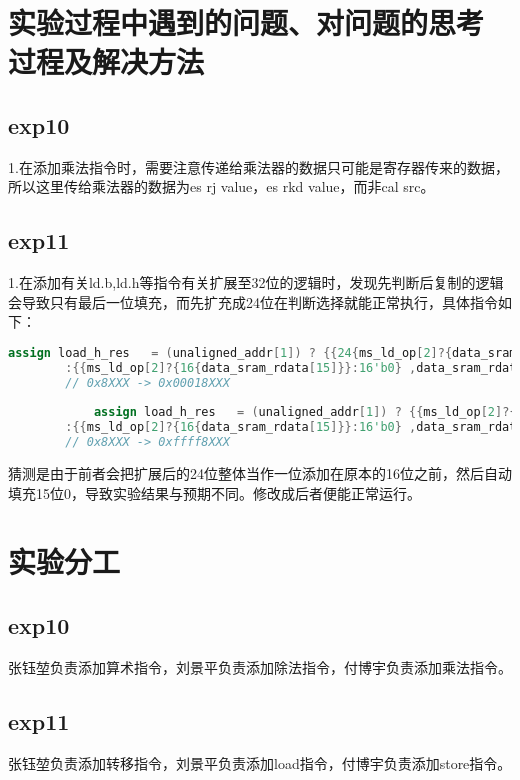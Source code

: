 \documentclass[12pt,a4paper]{article}
\newcommand*{\song}{\CJKfamily{zhsong}}
\newcommand{\sectionfont}{\song\textbf}
\begin{document}
\section{\sectionfont 实验过程中遇到的问题、对问题的思考过程及解决方法}
    \subsection{exp10}
        1.在添加乘法指令时，需要注意传递给乘法器的数据只可能是寄存器传来的数据，所以这里传给乘法器的数据为es rj value，es rkd value，而非cal src。
    \subsection{exp11}
        1.在添加有关ld.b,ld.h等指令有关扩展至32位的逻辑时，发现先判断后复制的逻辑会导致只有最后一位填充，而先扩充成24位在判断选择就能正常执行，具体指令如下：
        \begin{lstlisting}[language=Verilog]
            assign load_h_res   = (unaligned_addr[1]) ? {{24{ms_ld_op[2]?{data_sram_rdata[31]}:0}} ,data_sram_rdata[31:16]}
        :{{ms_ld_op[2]?{16{data_sram_rdata[15]}}:16'b0} ,data_sram_rdata[15:0]};
        // 0x8XXX -> 0x00018XXX
            
            assign load_h_res   = (unaligned_addr[1]) ? {{ms_ld_op[2]?{16{data_sram_rdata[31]}}:16'b0} ,data_sram_rdata[31:16]}
        :{{ms_ld_op[2]?{16{data_sram_rdata[15]}}:16'b0} ,data_sram_rdata[15:0]};
        // 0x8XXX -> 0xffff8XXX
        \end{lstlisting}
        猜测是由于前者会把扩展后的24位整体当作一位添加在原本的16位之前，然后自动填充15位0，导致实验结果与预期不同。修改成后者便能正常运行。
\section{\sectionfont 实验分工}
    \subsection{exp10}
        张钰堃负责添加算术指令，刘景平负责添加除法指令，付博宇负责添加乘法指令。
    \subsection{exp11}
        张钰堃负责添加转移指令，刘景平负责添加load指令，付博宇负责添加store指令。
\end{document}
